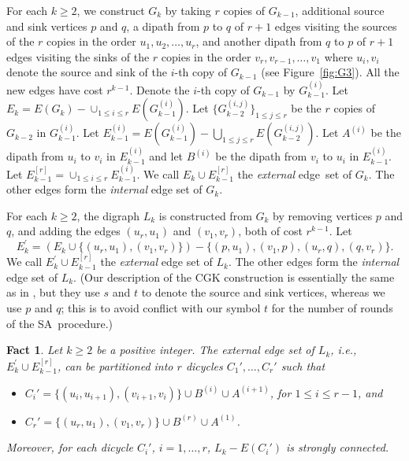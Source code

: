\documentclass[11pt]{article}
\newtheorem{fact}[theorem]{Fact}
\newcommand{\iSA}{\textsf{SA}}
\begin{document}
For each $k\geq 2$, we construct $G_k$ by taking $r$ copies of
$G_{k-1}$, additional source and sink vertices $p$ and $q$, a dipath
from $p$ to $q$ of $r+1$ edges visiting the sources of the $r$
copies in the order $u_1, u_2, \ldots, u_r$, and another dipath
from $q$ to $p$ of $r+1$ edges visiting the sinks of the $r$ copies
in the order $v_r, v_{r-1}, \ldots, v_1$ where $u_i, v_i$ denote
the source and sink of the $i$-th copy of $G_{k-1}$ (see
Figure~\ref{fig:G3}).
All the new edges have cost $r^{k-1}$. Denote the $i$-th copy of
$G_{k-1}$ by $G_{k-1}^{(i)}$. Let $E_k=E(G_{k})-\cup_{1\leq i\leq r}
E(G_{k-1}^{(i)})$. Let $\{G_{k-2}^{(i, j)}\}_{1\leq j\leq r}$ be the
$r$ copies of $G_{k-2}$ in $G_{k-1}^{(i)}$.
Let $E_{k-1}^{(i)}=E(G_{k-1}^{(i)})-
	\bigcup_{1\leq j\leq r} E(G_{k-2}^{(i,j)})$.
Let $A^{(i)}$ be the dipath from $u_i$ to $v_i$ in $E_{k-1}^{(i)}$
and let $B^{(i)}$ be the dipath from $v_i$ to $u_i$ in $E_{k-1}^{(i)}$.
Let $E^{[r]}_{k-1}=\cup_{1\leq i\leq r} E_{k-1}^{(i)}$.
We call $E_{k}\cup E^{[r]}_{k-1}$ the \textit{external} edge~set of $G_k$.
The other edges form the \textit{internal} edge set of $G_k$.

For each $k\ge2$,
the digraph $L_k$ is constructed from $G_k$ by removing vertices $p$
and $q$, and adding the edges $(u_r,u_1)$ and $(v_1,v_r)$, both of cost
$r^{k-1}$. Let 
$$E^{'}_k=(E_k\cup \{(u_r, u_1), (v_1, v_r)\})-\{ (p,
u_1), (v_1, p), (u_r, q), (q, v_r)\}.$$
 We call $E^{'}_k\cup E^{[r]}_{k-1}$
the \textit{external} edge set of $L_k$. The other edges form the
\textit{internal} edge set of $L_k$.
(Our description of the CGK construction is essentially the same
as in \cite{CGK06}, but they use $s$ and $t$ to denote
the source and sink vertices,
whereas we use $p$ and $q$;
this is to avoid conflict with our symbol $t$
for the number of rounds of the \iSA\ procedure.)


\begin{fact}
\label{fact:Lk-external}
Let $k\ge2$ be a positive integer.
The external edge set of $L_{k}$, i.e., $E_k^{'}\cup E^{[r]}_{k-1}$, can be
partitioned into $r$ dicycles $C_1', \ldots, C_{r}'$ such that
\begin{itemize}
\item[]
	$C_i'=\{(u_{i}, u_{i+1}), (v_{i+1}, v_{i})\}\cup
	B^{(i)}\cup A^{(i+1)}$, for $1\leq i\leq r-1$, and
\item[]
	$C_{r}'=\{(u_{r}, u_1), (v_1, v_{r})\}\cup B^{(r)}\cup A^{(1)}$.
\end{itemize}
Moreover, for each dicycle $C_i'$, $i=1,\dots,r$,
$L_{k}-E(C_i')$ is strongly connected.
\end{fact}
\end{document}
